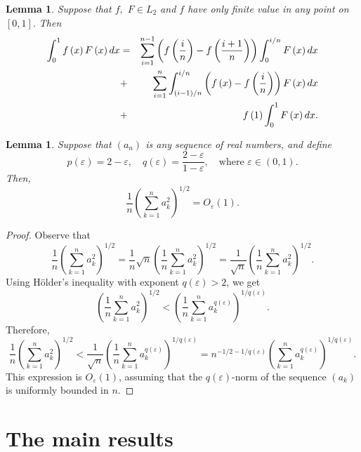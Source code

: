 \documentclass{publmathdeb}
\newtheorem{lemma}[theorem]{Lemma}
\begin{document}
	\begin{lemma}
		Suppose that  $f,$ $F \in L_2$ and $f$ have only finite value in any point on $[0,1].$ Then
		\begin{eqnarray} \label{eq3}
			\int_{0}^{1} f\left(x\right) F \left(x\right) dx &=&  \sum_{i=1}^{n-1}\left(f\left(\frac{i}{n}\right)-f\left(\frac{i+1}{n}\right)\right)\int_{0}^{i/n}F\left(x\right)dx  \notag \\
			&+& \sum_{i=1}^{n}\int_{\left(i-1\right)/n}^{i/n}\left(f\left(x\right) -f\left(\frac{i}{n}\right)\right)F\left(x\right)dx   \\
			&+&f\left(1\right)\int_{0}^{1}F\left(x\right)dx.    \notag
		\end{eqnarray}
	\end{lemma}
	
	\begin{lemma} \label{lemma2}
		Suppose that $(a_n)$ is any sequence of real numbers, and define 
		\[
		p(\varepsilon) = 2 - \varepsilon, \quad q(\varepsilon) = \frac{2 - \varepsilon}{1 - \varepsilon}, \quad \text{where } \varepsilon \in (0,1).
		\]
		Then,
		\[
		\frac{1}{n} \left( \sum_{k=1}^{n} a_k^2 \right)^{1/2} = O_\varepsilon(1).
		\]
		
	\end{lemma}
	\begin{proof}
		Observe that
		\[
		\frac{1}{n} \left( \sum_{k=1}^{n} a_k^2 \right)^{1/2}
		= \frac{1}{n} \sqrt{n} \left( \frac{1}{n} \sum_{k=1}^{n} a_k^2 \right)^{1/2}
		= \frac{1}{\sqrt{n}} \left( \frac{1}{n} \sum_{k=1}^{n} a_k^2 \right)^{1/2}.
		\]
		Using Hölder's inequality with exponent $q(\varepsilon) > 2$, we get
		\[
		\left( \frac{1}{n} \sum_{k=1}^{n} a_k^2 \right)^{1/2}
		< \left( \frac{1}{n} \sum_{k=1}^{n} a_k^{q(\varepsilon)} \right)^{1/q(\varepsilon)}.
		\]
		Therefore,
		\[
		\frac{1}{n} \left( \sum_{k=1}^{n} a_k^2 \right)^{1/2}
		< \frac{1}{\sqrt{n}} \left( \frac{1}{n} \sum_{k=1}^{n} a_k^{q(\varepsilon)} \right)^{1/q(\varepsilon)}
		= n^{-1/2 - 1/q(\varepsilon)} \left( \sum_{k=1}^{n} a_k^{q(\varepsilon)} \right)^{1/q(\varepsilon)}.
		\]
		This expression is $O_\varepsilon(1)$, assuming that the $q(\varepsilon)$-norm of the sequence $(a_k)$ is uniformly bounded in $n$.
		
	\end{proof}
	
	
	\section{The main results}
	
\end{document}
